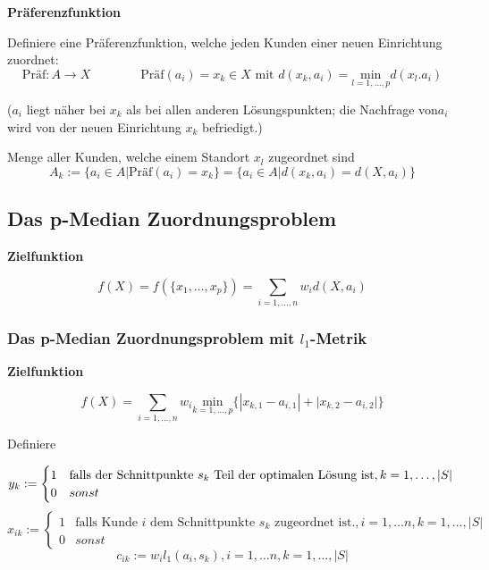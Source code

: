       \par \textbf{Präferenzfunktion}    
      \par Definiere eine Präferenzfunktion, welche jeden Kunden einer neuen Einrichtung zuordnet:
      \[\text{Präf}: A \rightarrow X \qquad \qquad \text{Präf}(a_i) = x_k \in X \text{ mit } d(x_k, a_i) = \underset{l=1, \dots, p}{\text{min}}d(x_l. a_i)\]

      \par ($a_i$ liegt näher bei $x_k$ als bei allen anderen Lösungspunkten; die Nachfrage von$a_i$ wird von der neuen Einrichtung $x_k$ befriedigt.)

      \par Menge aller Kunden, welche einem Standort $x_l$ zugeordnet sind
      \[A_k := \{a_i \in A | \text{Präf}(a_i) = x_k\} = \{a_i \in A | d(x_k, a_i) = d(X, a_i)\}\]

        \subsection{Das p-Median Zuordnungsproblem} %
        \label{sub:das_p_median_zuordnungsproblem}

          \par \textbf{Zielfunktion}

          \begin{equation}
            f(X) = f(\{x_1, \dots, x_p\}) = \sum_{i=1,\dots,n}w_id(X, a_i)
          \end{equation}
          \subsubsection{Das p-Median Zuordnungsproblem mit $l_1$-Metrik} %
          \label{ssub:das_p_median_zuordnungsproblem_mit_l1_metrik}
            
            \par \textbf{Zielfunktion}

            \[f(X) = \sum_{i = 1, \dots, n}w_i \underset{k = 1, \dots, p}{\text{min}}\{|x_{k,1} - a_{i,1}| + |{x_{k,2} - a_{i,2}|\}}\]

            \par Definiere

            \[
              y_k := 
              \begin{cases}
                1 & \text{falls der Schnittpunkte } s_k \text{ Teil der optimalen Lösung ist}, k = 1, \dots, |S|\\
                0 & sonst 
              \end{cases}\\ 
            \]
            \[
               x_{ik} := 
              \begin{cases}
                1 & \text{falls Kunde } i \text{ dem Schnittpunkte } s_k \text{ zugeordnet ist.}, i = 1, \dots n, k = 1, \dots, |S| \\
                0 & sonst
               \end{cases} 
            \]
            \[
              c_{ik} := w_il_1(a_i, s_k), i = 1, \dots n, k = 1, \dots, |S|
            \]

